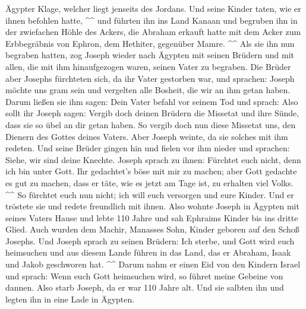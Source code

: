 Ägypter Klage, welcher liegt jenseits des Jordans.  Und
seine Kinder taten, wie er ihnen befohlen hatte, \^{}\^{} 
und führten ihn ins Land Kanaan und begruben ihn in der zwiefachen Höhle
des Ackers, die Abraham erkauft hatte mit dem Acker zum Erbbegräbnis von
Ephron, dem Hethiter, gegenüber Mamre. \^{}\^{}  Als sie
ihn nun begraben hatten, zog Joseph wieder nach Ägypten mit seinen
Brüdern und mit allen, die mit ihm hinaufgezogen waren, seinen Vater zu
begraben.  Die Brüder aber Josephs fürchteten sich, da ihr
Vater gestorben war, und sprachen: Joseph möchte uns gram sein und
vergelten alle Bosheit, die wir an ihm getan haben.  Darum
ließen sie ihm sagen: Dein Vater befahl vor seinem Tod und sprach:
 Also sollt ihr Joseph sagen: Vergib doch deinen Brüdern
die Missetat und ihre Sünde, dass sie so übel an dir getan haben. So
vergib doch nun diese Missetat uns, den Dienern des Gottes deines
Vaters. Aber Joseph weinte, da sie solches mit ihm redeten.
 Und seine Brüder gingen hin und fielen vor ihm nieder und
sprachen: Siehe, wir sind deine Knechte.  Joseph sprach zu
ihnen: Fürchtet euch nicht, denn ich bin unter Gott.  Ihr
gedachtet's böse mit mir zu machen; aber Gott gedachte es gut zu machen,
dass er täte, wie es jetzt am Tage ist, zu erhalten viel Volks. \^{}\^{}
 So fürchtet euch nun nicht; ich will euch versorgen und
eure Kinder. Und er tröstete sie und redete freundlich mit ihnen.
 Also wohnte Joseph in Ägypten mit seines Vaters Hause und
lebte 110 Jahre  und sah Ephraims Kinder bis ins dritte
Glied. Auch wurden dem Machir, Manasses Sohn, Kinder geboren auf den
Schoß Josephs.  Und Joseph sprach zu seinen Brüdern: Ich
sterbe, und Gott wird euch heimsuchen und aus diesem Lande führen in das
Land, das er Abraham, Isaak und Jakob geschworen hat. \^{}\^{}
 Darum nahm er einen Eid von den Kindern Israel und sprach:
Wenn euch Gott heimsuchen wird, so führet meine Gebeine von dannen.
 Also starb Joseph, da er war 110 Jahre alt. Und sie
salbten ihn und legten ihn in eine Lade in Ägypten.
